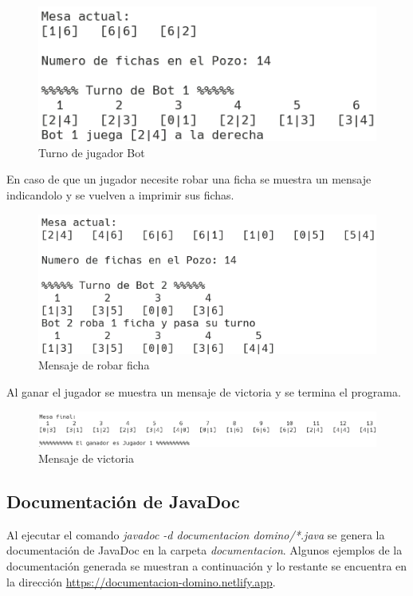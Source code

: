 \documentclass[12pt]{article}
\begin{document}
  \begin{figure}[h!]
    \centering
    \includegraphics{pf4.png}
    \caption{Turno de jugador Bot}
  \end{figure}
  
  \newpage
  En caso de que un jugador necesite robar una ficha se muestra un mensaje indicandolo y se vuelven a imprimir sus fichas.

  \begin{figure}[h!]
    \centering
    \includegraphics{pf5.png}
    \caption{Mensaje de robar ficha} 
  \end{figure}

  Al ganar el jugador se muestra un mensaje de victoria y se termina el programa.

  \begin{figure}[h!]
    \centering
    \includegraphics[scale=0.8]{pf6.png}
    \caption{Mensaje de victoria}
  \end{figure}

  \subsection{Documentación de JavaDoc}
  Al ejecutar el comando \textit{javadoc -d documentacion domino/*.java} se genera la documentación de JavaDoc en la carpeta \textit{documentacion}. Algunos ejemplos de la documentación generada se muestran a continuación y lo restante se encuentra en la dirección \url{https://documentacion-domino.netlify.app}.
\end{document}
